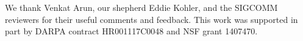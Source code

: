 \label{s:acknowledgements}
 We thank
Venkat Arun,
our shepherd Eddie Kohler,
and the SIGCOMM reviewers for their useful comments and feedback.
This work was supported in part by DARPA contract HR001117C0048 and NSF grant 1407470.
